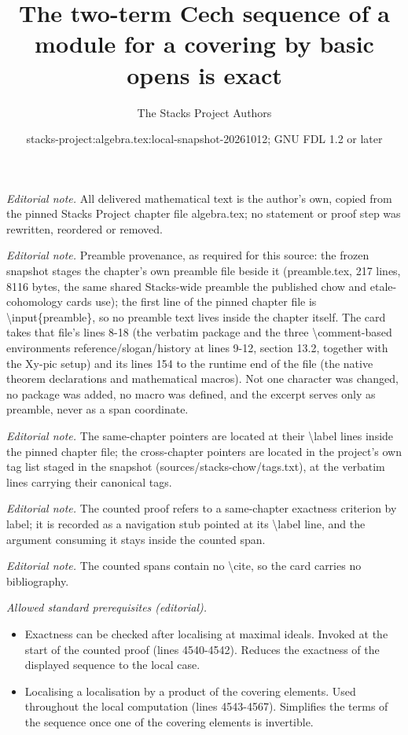 \documentclass[10pt,a4paper]{amsart}
\title{The two-term Cech sequence of a module for a covering by basic opens is exact}
\author{The Stacks Project Authors}
\date{stacks-project:algebra.tex:local-snapshot-20261012; GNU FDL 1.2 or later}
\theoremstyle{plain}
\theoremstyle{definition}
\theoremstyle{remark}
\numberwithin{equation}{subsection}
\begin{document}
\maketitle
\noindent\textit{Editorial note.} All delivered mathematical text is the author's own, copied from the pinned Stacks Project chapter file algebra.tex; no statement or proof step was rewritten, reordered or removed.\par\medskip
\noindent\textit{Editorial note.} Preamble provenance, as required for this source: the frozen snapshot stages the chapter's own preamble file beside it (preamble.tex, 217 lines, 8116 bytes, the same shared Stacks-wide preamble the published chow and etale-cohomology cards use); the first line of the pinned chapter file is \textbackslash{}input\{preamble\}, so no preamble text lives inside the chapter itself. The card takes that file's lines 8-18 (the verbatim package and the three \textbackslash{}comment-based environments reference/slogan/history at lines 9-12, section 13.2, together with the Xy-pic setup) and its lines 154 to the runtime end of the file (the native theorem declarations and mathematical macros). Not one character was changed, no package was added, no macro was defined, and the excerpt serves only as preamble, never as a span coordinate.\par\medskip
\noindent\textit{Editorial note.} The same-chapter pointers are located at their \textbackslash{}label lines inside the pinned chapter file; the cross-chapter pointers are located in the project's own tag list staged in the snapshot (sources/stacks-chow/tags.txt), at the verbatim lines carrying their canonical tags.\par\medskip
\noindent\textit{Editorial note.} The counted proof refers to a same-chapter exactness criterion by label; it is recorded as a navigation stub pointed at its \textbackslash{}label line, and the argument consuming it stays inside the counted span.\par\medskip
\noindent\textit{Editorial note.} The counted spans contain no \textbackslash{}cite, so the card carries no bibliography.\par\medskip
\noindent\textit{Allowed standard prerequisites (editorial).}\begin{itemize}
\item Exactness can be checked after localising at maximal ideals. Invoked at the start of the counted proof (lines 4540-4542). Reduces the exactness of the displayed sequence to the local case.
\item Localising a localisation by a product of the covering elements. Used throughout the local computation (lines 4543-4567). Simplifies the terms of the sequence once one of the covering elements is invertible.
\end{itemize}\medskip
\end{document}
